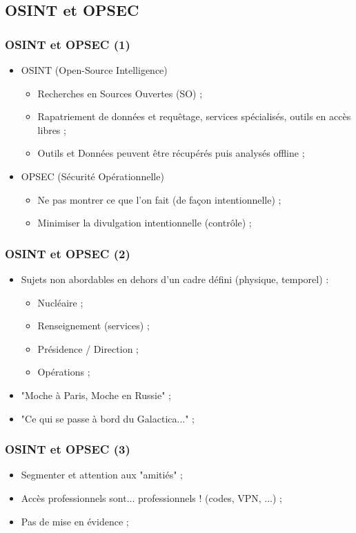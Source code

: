 \documentclass[slidetop,11pt]{beamer}
\begin{document}
\subsection{OSINT et OPSEC}
\begin{frame}
	\frametitle{OSINT et OPSEC (1)}
	\begin{itemize}
		\item OSINT (Open-Source Intelligence)
		\begin{itemize}
			\item Recherches en Sources Ouvertes (SO) ; 
			\item Rapatriement de donn{\'e}es et requ{\^e}tage, services sp{\'e}cialis{\'e}s, outils en acc{\`e}s libres ; 
			\item Outils et Donn{\'e}es peuvent {\^e}tre r{\'e}cup{\'e}r{\'e}s puis analys{\'e}s offline ; 
		\end{itemize}
		\item OPSEC (S{\'e}curit{\'e} Op{\'e}rationnelle)
		\begin{itemize}
			\item Ne pas montrer ce que l'on fait (de fa\c{c}on intentionnelle) ; 
			\item Minimiser la divulgation intentionnelle (contr{\^o}le) ; 
		\end{itemize}
	\end{itemize}
\end{frame}

\begin{frame}
	\frametitle{OSINT et OPSEC (2)}
	\begin{itemize}
		\item Sujets non abordables en dehors d'un cadre d{\'e}fini (physique, temporel) : 
		\begin{itemize}
			\item Nucl{\'e}aire ;  
			\item Renseignement (services) ; 
			\item Pr{\'e}sidence / Direction ; 
			\item Op{\'e}rations ; 
		\end{itemize}
		\item "Moche {\`a} Paris, Moche en Russie" ; 
		\item "Ce qui se passe {\`a} bord du Galactica..." ; 
	\end{itemize}
\end{frame}

\begin{frame}
	\frametitle{OSINT et OPSEC (3)}
	\begin{itemize}
		\item Segmenter et attention aux "amiti{\'e}s" ; 
		\item Acc{\`e}s professionnels sont... professionnels ! (codes, VPN, ...) ; 
		\item Pas de mise en {\'e}vidence ; 
	\end{itemize}
\end{frame}
\end{document}
